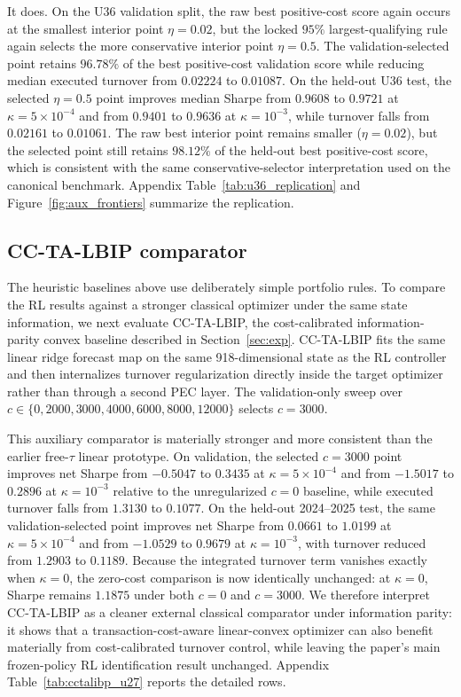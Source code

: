 \documentclass[10pt,twocolumn]{article}
\begin{document}
It does. On the U36 validation split, the raw best positive-cost score again occurs at the smallest interior point $\eta=0.02$, but the locked $95\%$ largest-qualifying rule again selects the more conservative interior point $\eta=0.5$. The validation-selected point retains $96.78\%$ of the best positive-cost validation score while reducing median executed turnover from $0.02224$ to $0.01087$. On the held-out U36 test, the selected $\eta=0.5$ point improves median Sharpe from $0.9608$ to $0.9721$ at $\kappa=5\times10^{-4}$ and from $0.9401$ to $0.9636$ at $\kappa=10^{-3}$, while turnover falls from $0.02161$ to $0.01061$. The raw best interior point remains smaller ($\eta=0.02$), but the selected point still retains $98.12\%$ of the held-out best positive-cost score, which is consistent with the same conservative-selector interpretation used on the canonical benchmark. Appendix Table~\ref{tab:u36_replication} and Figure~\ref{fig:aux_frontiers} summarize the replication.


\subsection{CC-TA-LBIP comparator}
The heuristic baselines above use deliberately simple portfolio rules. To compare the RL results against a stronger classical optimizer under the same state information, we next evaluate CC-TA-LBIP, the cost-calibrated information-parity convex baseline described in Section~\ref{sec:exp}. CC-TA-LBIP fits the same linear ridge forecast map on the same 918-dimensional state as the RL controller and then internalizes turnover regularization directly inside the target optimizer rather than through a second PEC layer. The validation-only sweep over $c\in\{0,2000,3000,4000,6000,8000,12000\}$ selects $c=3000$.

This auxiliary comparator is materially stronger and more consistent than the earlier free-$\tau$ linear prototype. On validation, the selected $c=3000$ point improves net Sharpe from $-0.5047$ to $0.3435$ at $\kappa=5\times10^{-4}$ and from $-1.5017$ to $0.2896$ at $\kappa=10^{-3}$ relative to the unregularized $c=0$ baseline, while executed turnover falls from $1.3130$ to $0.1077$. On the held-out 2024--2025 test, the same validation-selected point improves net Sharpe from $0.0661$ to $1.0199$ at $\kappa=5\times10^{-4}$ and from $-1.0529$ to $0.9679$ at $\kappa=10^{-3}$, with turnover reduced from $1.2903$ to $0.1189$. Because the integrated turnover term vanishes exactly when $\kappa=0$, the zero-cost comparison is now identically unchanged: at $\kappa=0$, Sharpe remains $1.1875$ under both $c=0$ and $c=3000$. We therefore interpret CC-TA-LBIP as a cleaner external classical comparator under information parity: it shows that a transaction-cost-aware linear-convex optimizer can also benefit materially from cost-calibrated turnover control, while leaving the paper's main frozen-policy RL identification result unchanged. Appendix Table~\ref{tab:cctalibp_u27} reports the detailed rows.
\end{document}
